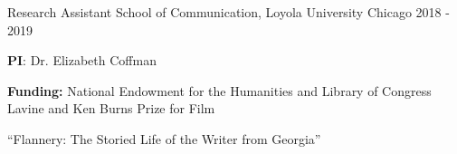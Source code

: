 \begin{cventries}
    \cventry
    {Research Assistant} %
    {School of Communication, Loyola University Chicago} %
    {} %
    {2018 - 2019} %
    {
      \begin{cvitems} %
              \item {\textbf{PI}: Dr. Elizabeth Coffman}
                \item {\textbf{Funding: }National Endowment for the Humanities and Library of Congress Lavine and Ken Burns Prize for Film}
                \item {“Flannery: The Storied Life of the Writer from Georgia”}
      \end{cvitems}
    }

\end{cventries}












